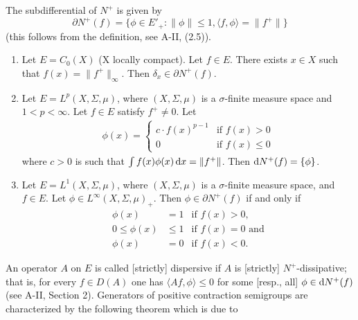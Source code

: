 The subdifferential of $N^{+}$ is given by
\begin{equation}\label{eq:c2-1.2}
	\partial N^{+}(f) = \{\phi \in E'_{+} \colon \|\phi\| \leq 1, \langle f,\phi \rangle = \|f^{+}\|\}
\end{equation}
(this follows from the definition, see A-II, (2.5)). 
\begin{examples}\label{ex:c2-1.1}
\begin{enumerate}[\upshape (i), wide, labelsep=.5em]  %
\item \label{ex:c2-1.1-1}
Let $E = C_{0}(X)$ (X locally compact). 
Let $f \in E$.
There exists $x \in X$ such that $f(x) = \|f^{+}\|_{\infty}$. 
Then $\delta_{x} \in \partial N^{+}(f)$.
\item \label{ex:c2-1.1-2}
Let $E = L^{p}(X,\Sigma,\mu)$, where $(X,\Sigma,\mu)$ is a $\sigma$-finite measure space and $1 < p < \infty$. Let $f \in E$ satisfy $f^{+} \neq 0$. Let
\begin{align*}
\phi(x) = 
    \begin{cases}
        c \cdot f(x)^{p-1} & \text{if } f(x) > 0 \\
        0 & \text{if } f(x) \leq 0
    \end{cases}
\end{align*}
where $c > 0$ is such that $\int f(x) \phi(x) \mathop{}\!\mathrm{d}{x} = \|f^{+}\|$.
Then $\mathop{}\!\mathrm{d}{N^{+}}(f) = \{\phi\}$.
\item \label{ex:c2-1.1-3}
Let $E = L^{1}(X,\Sigma,\mu)$, where $(X,\Sigma,\mu)$ is a $\sigma$-finite measure space, and $f \in E$. Let $\phi \in L^{\infty}(X,\Sigma,\mu)_{+}$. Then $\phi \in \partial N^{+}(f)$ if and only if
\begin{align*}
\phi(x) &= 1 & \text{if } f(x) > 0, \\
0 \leq \phi(x) &\leq 1 & \text{if } f(x) = 0 \text{ and} \\
\phi(x) &= 0 & \text{if } f(x) < 0.
\end{align*}
\end{enumerate}
\end{examples}
An operator $A$ on $E$ is called [strictly] dispersive if $A$ is [strictly] $N^{+}$-dissipative; that is, for every $f \in D(A)$ one has $\langle Af,\phi \rangle \leq 0$ for some [resp., all] $\phi \in \mathop{}\!\mathrm{d}{N^{+}}(f)$ (see A-II, Section 2). 
Generators of positive contraction semigroups are characterized by the following theorem which is due to 
